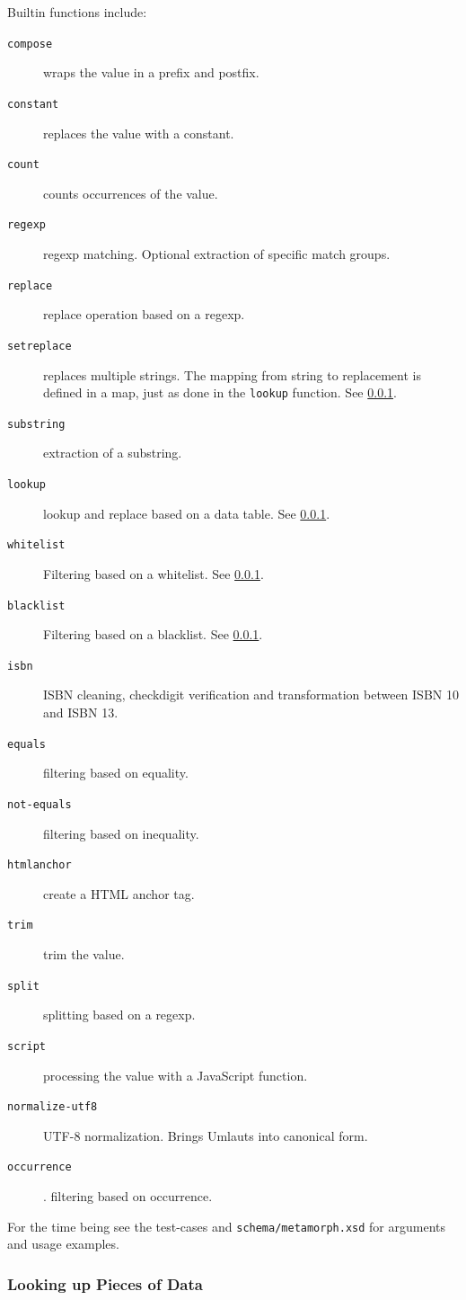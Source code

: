 \documentclass[12pt,a4paper]{article}
\begin{document}
Builtin functions include:
\begin{description}
\item[{\tt compose}] wraps the value in a prefix and postfix.
\item[{\tt constant}] replaces the value with a constant.
\item[{\tt count}] counts occurrences of the value.
\item[{\tt regexp}] regexp matching. Optional extraction of specific match groups.
 \item[{\tt replace}] replace operation based on a regexp.
 \item[{\tt setreplace}] replaces multiple strings. The mapping from string to replacement is defined in a map, just as done in the {\tt lookup} function. See \ref{lookup}.
\item[{\tt substring}] extraction of a substring.
\item[{\tt lookup}] lookup and replace based on a data table. See \ref{lookup}.
\item[{\tt whitelist}] Filtering based on a whitelist. See \ref{lookup}.
 \item[{\tt blacklist}] Filtering based on a blacklist. See \ref{lookup}.
 \item[{\tt isbn}] ISBN cleaning, checkdigit verification and transformation between ISBN 10 and ISBN 13.
 \item[{\tt equals}] filtering based on equality.
\item[{\tt not-equals}] filtering based on inequality.
 \item[{\tt htmlanchor}] create a HTML anchor tag.
 \item[{\tt trim}] trim the value.
 \item[{\tt split}] splitting based on a regexp.
 \item[{\tt script}] processing the value with a JavaScript function. 
 \item[{\tt normalize-utf8}]  UTF-8 normalization. Brings Umlauts into canonical form.
\item[{\tt occurrence}]. filtering based on occurrence.
\end{description}

For the time being see the test-cases and {\tt schema/metamorph.xsd} for arguments and usage examples.



\subsubsection{Looking up  Pieces of Data}\label{lookup}
\end{document}
